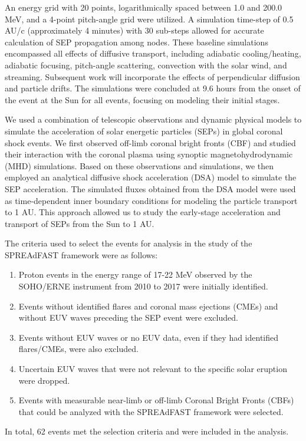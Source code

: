 An energy grid with 20 points, logarithmically spaced between 1.0 and 200.0 MeV, and a 4-point pitch-angle grid were utilized. A simulation time-step of 0.5 AU/c (approximately 4 minutes) with 30 sub-steps allowed for accurate calculation of SEP propagation among nodes. These baseline simulations encompassed all effects of diffusive transport, including adiabatic cooling/heating, adiabatic focusing, pitch-angle scattering, convection with the solar wind, and streaming. Subsequent work will incorporate the effects of perpendicular diffusion and particle drifts. The simulations were concluded at 9.6 hours from the onset of the event at the Sun for all events, focusing on modeling their initial stages.







We used a combination of telescopic observations and dynamic physical models to simulate the acceleration of solar energetic particles (SEPs) in global coronal shock events. We first observed off-limb coronal bright fronts (CBF) and studied their interaction with the coronal plasma using synoptic magnetohydrodynamic (MHD) simulations. Based on these observations and simulations, we then employed an analytical diffusive shock acceleration (DSA) model to simulate the SEP acceleration. The simulated fluxes obtained from the DSA model were used as time-dependent inner boundary conditions for modeling the particle transport to 1 AU. This approach allowed us to study the early-stage acceleration and transport of SEPs from the Sun to 1 AU.

The criteria used to select the events for analysis in the study of the SPREAdFAST framework were as follows:
\begin{enumerate}
    \item Proton events in the energy range of 17-22 MeV observed by the SOHO/ERNE instrument from 2010 to 2017 were initially identified.
    \item Events without identified flares and coronal mass ejections (CMEs) and without EUV waves preceding the SEP event were excluded.
    \item Events without EUV waves or no EUV data, even if they had identified flares/CMEs, were also excluded.
    \item Uncertain EUV waves that were not relevant to the specific solar eruption were dropped.
    \item Events with measurable near-limb or off-limb Coronal Bright Fronts (CBFs) that could be analyzed with the SPREAdFAST framework were selected.
\end{enumerate}
In total, 62 events met the selection criteria and were included in the analysis.

